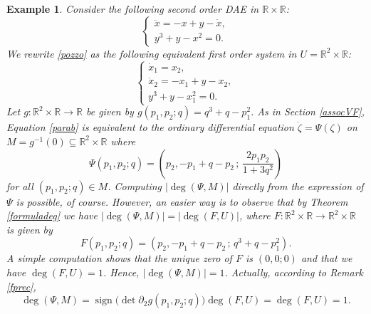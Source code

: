 \documentclass[a4paper]{amsart}
\numberwithin{equation}{section}
\newtheorem{example}[theorem]{Example}
\newcommand{\R}{\mathbb{R}}
\newcommand{\sign}{\mathop\mathrm{sign}\nolimits}
\begin{document}
\begin{example}
Consider the following second order DAE in $\R\times\R$:
\begin{equation}\label{pozzo}
\left\{
\begin{array}{l}
 \ddot x = -x+y-\dot x,\\
 y^3+y-x^2 =0.
\end{array}\right.
\end{equation}
We rewrite \eqref{pozzo} as the following equivalent first order system in $U=\R^2\times\R$:
\begin{equation}\label{parab}
 \left\{
\begin{array}{l}
 \dot x_1 = x_2,\\
 \dot x_2= -x_1+y-x_2,\\
 y^3+y-x_1^2 =0.
\end{array}\right.
\end{equation}
Let $g:\R^2\times\R\to\R$ be given by $g(p_1,p_2;q)=q^3+q-p_1^2$. As in Section
\ref{assocVF}, Equation \eqref{parab} is equivalent to the ordinary differential equation 
$\dot\zeta=\Psi(\zeta)$ on $M=g^{-1}(0)\subseteq\R^2\times\R$ where 
\[
\Psi(p_1,p_2;q)=\left(p_2, -p_1+q-p_2\,;\,
                  \frac{2p_1p_2}{1+3q^2} \right)
\] 
for all $(p_1,p_2;q)\in M$. Computing $|\deg(\Psi,M)|$ directly from the expression of $\Psi$ 
is possible, of course. However, an easier way is to observe that by Theorem \ref{formuladeg}
we have $\big|\deg(\Psi,M)\big|=\big|\deg(F,U)\big|$, where $F:\R^2\times\R\to\R^2\times\R$ 
is given by 
\[
F(p_1,p_2;q)=\left(p_2, -p_1+q-p_2\,;\,q^3+q-p_1^2\right).
\]
A simple computation shows that the unique zero of $F$ is $(0,0;0)$ and that we have
$\deg(F,U)=1$. Hence, $\big|\deg(\Psi,M)\big|=1$. Actually, according to Remark \ref{fprec}, 
\[
 \deg(\Psi,M)=\sign\big(\det\partial_2 g(p_1,p_2;q)\big)\deg(F,U)=\deg(F,U)=1.
\]
\end{example}
\end{document}
